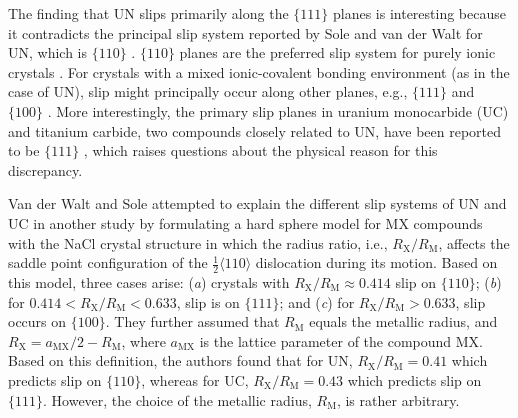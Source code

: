 \documentclass[applsci,article,submit,pdftex,moreauthors]{Definitions/mdpi}
\newcommand{\?}{\stackrel{?}{=}}
\begin{document}
The finding that UN slips primarily along the $\{111\}$ planes is interesting because it contradicts the principal slip system reported by Sole and van der Walt for UN, which is $\{110\}$ \cite{Sole1968}. $\{110\}$ planes are the preferred slip system for purely ionic crystals \cite{VanDerWalt1967, Hull2011}. For crystals with a mixed ionic-covalent bonding environment (as in the case of UN), slip might principally occur along other planes, e.g., $\{111\}$ and $\{100\}$ \cite{VanDerWalt1967, Yadav2014}. More interestingly, the primary slip planes in uranium monocarbide (UC) and titanium carbide, two compounds closely related to UN, have been reported to be $\{111\}$ \cite{Sole1968, Vasudevamurthy2022}, which raises questions about the physical reason for this discrepancy.

Van der Walt and Sole attempted to explain the different slip systems of UN and UC in another study \cite{VanDerWalt1967} by formulating a hard sphere model for MX compounds with the NaCl crystal structure in which the radius ratio, i.e., $R_\text{X}/R_\text{M}$, affects the saddle point configuration of the $\frac{1}{2}\langle110\rangle$ dislocation during its motion. Based on this model, three cases arise: (\textit{a}) crystals with $R_\text{X}/R_\text{M} \approx 0.414$ slip on $\{110\}$; (\textit{b}) for $0.414 < R_\text{X}/R_\text{M} < 0.633$, slip is on $\{111\}$; and (\textit{c}) for $R_\text{X}/R_\text{M} > 0.633$, slip occurs on $\{100\}$. They further assumed that $R_\text{M}$ equals the metallic radius, and $R_\text{X} = a_\text{MX}/2 - R_\text{M}$, where $a_\text{MX}$ is the lattice parameter of the compound MX. Based on this definition, the authors found that for UN, $R_\text{X}/R_\text{M} = 0.41$ which predicts slip on $\{110\}$, whereas for UC, $R_\text{X}/R_\text{M} = 0.43$ which predicts slip on $\{111\}$. However, the choice of the metallic radius, $R_\text{M}$, is rather arbitrary.
\end{document}
